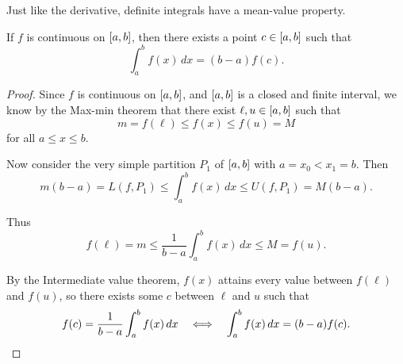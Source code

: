 

Just like the derivative, definite integrals have a mean-value property.

\begin{theorem}
	If $f$ is continuous on $\interval{a}{b}$, then there exists a point $c \in \interval{a}{b}$ such that
	\[
		\int_a^b f(x) \, d x = (b - a) f(c).
	\]
\end{theorem}

\begin{proof}
	Since $f$ is continuous on $\interval{a}{b}$, and $\interval{a}{b}$ is a closed and finite interval, we know by the Max-min theorem that there exist $\ell, u \in \interval{a}{b}$ such that
	\[
		m = f(\ell) \leq f(x) \leq f(u) = M
	\]
	for all $a \leq x \leq b$.

	Now consider the very simple partition $P_1$ of $\interval{a}{b}$ with $a = x_0 < x_1 = b$.
	Then
	\[
		m (b - a) = L(f, P_1) \leq \int_a^b f(x) \, d x \leq U(f, P_1) = M(b - a).
	\]

	\noindent
	Thus
	\[
		f(\ell) = m \leq \frac{1}{b - a} \int_a^b f(x) \, d x \leq M = f(u).
	\]

	\noindent
	By the Intermediate value theorem, $f(x)$ attains every value between $f(\ell)$ and $f(u)$, so there exists some $c$ between $\ell$ and $u$ such that
	\[
		f(c) = \frac{1}{b - a} \int_a^b f(x) \, d x \quad \Longleftrightarrow \quad \int_a^b f(x) \, d x = (b - a) f(c). \qedhere
	\]
\end{proof}

